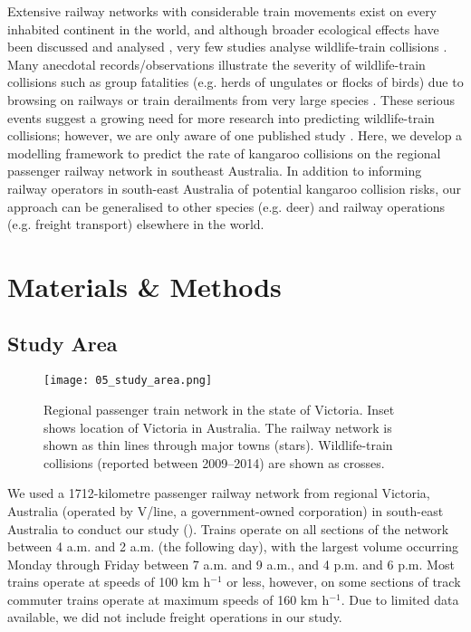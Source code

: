 Extensive railway networks with considerable train movements exist on every inhabited continent in the world, and although broader ecological effects have been discussed \citep{desa93,givo06} and analysed \citep{wall05}, very few studies analyse wildlife-train collisions \citep[but see][]{bela95,onoy98}. Many anecdotal records/observations illustrate the severity of wildlife-train collisions such as group fatalities (e.g. herds of ungulates or flocks of birds) due to browsing on railways or train derailments from very large species \citep{dors15}. These serious events suggest a growing need for more research into predicting wildlife-train collisions; however, we are only aware of one published study \citep[see][]{gund98}. Here, we develop a modelling framework to predict the rate of kangaroo collisions on the regional passenger railway network in southeast Australia. In addition to informing railway operators in south-east Australia of potential kangaroo collision risks, our approach can be generalised to other species (e.g. deer) and railway operations (e.g. freight transport) elsewhere in the world.

\section{Materials \& Methods}

\subsection{Study Area}

\begin{figure*}[!t]
  \centering
  \texttt{[image: 05\_study\_area.png]}
  \caption[Regional passenger train network in Victoria]{Regional passenger train network in the state of Victoria. Inset shows location of Victoria in Australia. The railway network is shown as thin lines through major towns (stars). Wildlife-train collisions (reported between 2009--2014) are shown as crosses.}
  \label{trains_study_area}
\end{figure*}

We used a 1712-kilometre passenger railway network from regional Victoria, Australia (operated by V/line, a government-owned corporation) in south-east Australia to conduct our study ().  Trains operate on all sections of the network between 4 a.m. and 2 a.m. (the following day), with the largest volume occurring Monday through Friday between 7 a.m. and 9 a.m., and 4 p.m. and 6 p.m. Most trains operate at speeds of 100 km h$^{-1}$ or less, however, on some sections of track commuter trains operate at maximum speeds of 160 km h$^{-1}$. Due to limited data available, we did not include freight operations in our study.

